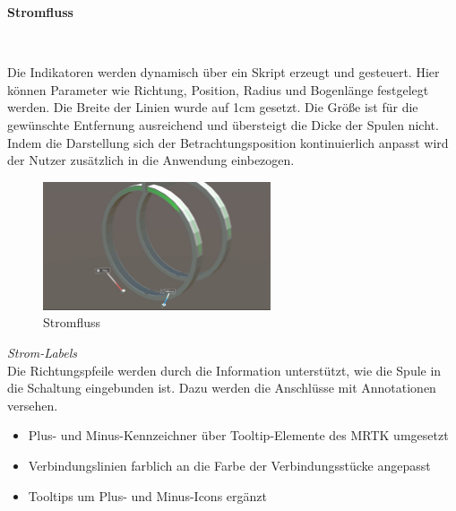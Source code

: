 \textbf{Stromfluss}
\vspace{4px}
\begin{center}
	\\
\end{center}
\vspace{6px}

Die Indikatoren werden dynamisch über ein Skript erzeugt und gesteuert. Hier können Parameter wie Richtung, Position, Radius und Bogenlänge festgelegt werden. Die Breite der Linien wurde auf 1cm gesetzt. Die Größe ist für die gewünschte Entfernung ausreichend und übersteigt die Dicke der Spulen nicht. Indem die Darstellung sich der Betrachtungsposition kontinuierlich anpasst wird der Nutzer zusätzlich in die Anwendung einbezogen.\\

\begin{figure}[H]
	\centering
	\includegraphics[width=0.6\textwidth]{images/current.jpg}
	\caption{Stromfluss}
	\label{img:current}
\end{figure}

\textit{Strom-Labels}\\
Die Richtungspfeile werden durch die Information unterstützt, wie die Spule in die Schaltung eingebunden ist. Dazu werden die Anschlüsse mit Annotationen versehen.
\begin{itemize}
	\setlength{\itemsep}{-1pt}
	\singlespacing
	\item Plus- und Minus-Kennzeichner über Tooltip-Elemente des MRTK umgesetzt
	\item Verbindungslinien farblich an die Farbe der Verbindungsstücke angepasst
	\item Tooltips um Plus- und Minus-Icons ergänzt
\end{itemize}

